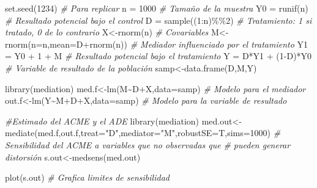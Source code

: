 \documentclass[
]{article}
\newenvironment{Shaded}{\begin{snugshade}}{\end{snugshade}}
\newcommand{\AttributeTok}[1]{\textcolor[rgb]{0.77,0.63,0.00}{#1}}
\newcommand{\CommentTok}[1]{\textcolor[rgb]{0.56,0.35,0.01}{\textit{#1}}}
\newcommand{\DecValTok}[1]{\textcolor[rgb]{0.00,0.00,0.81}{#1}}
\newcommand{\FunctionTok}[1]{\textcolor[rgb]{0.00,0.00,0.00}{#1}}
\newcommand{\NormalTok}[1]{#1}
\newcommand{\OtherTok}[1]{\textcolor[rgb]{0.56,0.35,0.01}{#1}}
\newcommand{\SpecialCharTok}[1]{\textcolor[rgb]{0.00,0.00,0.00}{#1}}
\newcommand{\StringTok}[1]{\textcolor[rgb]{0.31,0.60,0.02}{#1}}
\begin{document}
\begin{Shaded}
\begin{Highlighting}[]
\FunctionTok{set.seed}\NormalTok{(}\DecValTok{1234}\NormalTok{) }\CommentTok{\# Para replicar}
\NormalTok{n }\OtherTok{=} \DecValTok{1000} \CommentTok{\# Tamaño de la muestra}
\NormalTok{Y0 }\OtherTok{=} \FunctionTok{runif}\NormalTok{(n) }\CommentTok{\# Resultado potencial bajo el control}
\NormalTok{D }\OtherTok{=} \FunctionTok{sample}\NormalTok{((}\DecValTok{1}\SpecialCharTok{:}\NormalTok{n)}\SpecialCharTok{\%\%}\DecValTok{2}\NormalTok{) }\CommentTok{\# Tratamiento: 1 si tratado, 0 de lo contrario}
\NormalTok{X}\OtherTok{\textless{}{-}}\FunctionTok{rnorm}\NormalTok{(n) }\CommentTok{\# Covariables}
\NormalTok{M}\OtherTok{\textless{}{-}}\FunctionTok{rnorm}\NormalTok{(}\AttributeTok{n=}\NormalTok{n,}\AttributeTok{mean=}\NormalTok{D}\SpecialCharTok{+}\FunctionTok{rnorm}\NormalTok{(n)) }\CommentTok{\# Mediador influenciado por el tratamiento}
\NormalTok{Y1 }\OtherTok{=}\NormalTok{ Y0 }\SpecialCharTok{+} \DecValTok{1} \SpecialCharTok{+}\NormalTok{ M }\CommentTok{\#  Resultado potencial bajo el tratamiento}
\NormalTok{Y }\OtherTok{=}\NormalTok{ D}\SpecialCharTok{*}\NormalTok{Y1 }\SpecialCharTok{+}\NormalTok{ (}\DecValTok{1}\SpecialCharTok{{-}}\NormalTok{D)}\SpecialCharTok{*}\NormalTok{Y0 }\CommentTok{\#  Variable de resultado de la población }
\NormalTok{samp}\OtherTok{\textless{}{-}}\FunctionTok{data.frame}\NormalTok{(D,M,Y) }

\FunctionTok{library}\NormalTok{(mediation) }
\NormalTok{med.f}\OtherTok{\textless{}{-}}\FunctionTok{lm}\NormalTok{(M}\SpecialCharTok{\textasciitilde{}}\NormalTok{D}\SpecialCharTok{+}\NormalTok{X,}\AttributeTok{data=}\NormalTok{samp) }\CommentTok{\# Modelo para el mediador}
\NormalTok{out.f}\OtherTok{\textless{}{-}}\FunctionTok{lm}\NormalTok{(Y}\SpecialCharTok{\textasciitilde{}}\NormalTok{M}\SpecialCharTok{+}\NormalTok{D}\SpecialCharTok{+}\NormalTok{X,}\AttributeTok{data=}\NormalTok{samp) }\CommentTok{\# Modelo para la variable de resultado}

\CommentTok{\#Estimado del ACME y el  ADE }
\FunctionTok{library}\NormalTok{(mediation) }
\NormalTok{med.out}\OtherTok{\textless{}{-}}
\FunctionTok{mediate}\NormalTok{(med.f,out.f,}\AttributeTok{treat=}\StringTok{"D"}\NormalTok{,}\AttributeTok{mediator=}\StringTok{"M"}\NormalTok{,}\AttributeTok{robustSE=}\NormalTok{T,}\AttributeTok{sims=}\DecValTok{1000}\NormalTok{) }
\CommentTok{\# Sensibilidad del ACME a variables que no observadas que }
\CommentTok{\# pueden generar distorsión}
\NormalTok{s.out}\OtherTok{\textless{}{-}}\FunctionTok{medsens}\NormalTok{(med.out) }

\FunctionTok{plot}\NormalTok{(s.out) }\CommentTok{\# Grafica limites de sensibilidad}
\end{Highlighting}
\end{Shaded}
\end{document}
